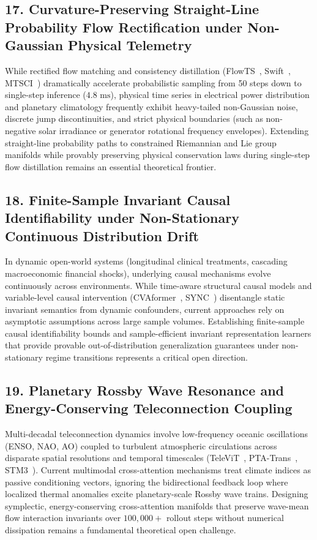 \subsection{17. Curvature-Preserving Straight-Line Probability Flow Rectification under Non-Gaussian Physical Telemetry}
While rectified flow matching and consistency distillation (FlowTS~\cite{Hu2024FlowTS}, Swift~\cite{Stock2025Swift}, MTSCI~\cite{Zhou2024MTSCI}) dramatically accelerate probabilistic sampling from 50 steps down to single-step inference ($4.8\text{ ms}$), physical time series in electrical power distribution and planetary climatology frequently exhibit heavy-tailed non-Gaussian noise, discrete jump discontinuities, and strict physical boundaries (such as non-negative solar irradiance or generator rotational frequency envelopes). Extending straight-line probability paths to constrained Riemannian and Lie group manifolds while provably preserving physical conservation laws during single-step flow distillation remains an essential theoretical frontier.

\subsection{18. Finite-Sample Invariant Causal Identifiability under Non-Stationary Continuous Distribution Drift}
In dynamic open-world systems (longitudinal clinical treatments, cascading macroeconomic financial shocks), underlying causal mechanisms evolve continuously across environments. While time-aware structural causal models and variable-level causal intervention (CVAformer~\cite{Zhang2026CVAformer}, SYNC~\cite{He2025SYNC}) disentangle static invariant semantics from dynamic confounders, current approaches rely on asymptotic assumptions across large sample volumes. Establishing finite-sample causal identifiability bounds and sample-efficient invariant representation learners that provide provable out-of-distribution generalization guarantees under non-stationary regime transitions represents a critical open direction.

\subsection{19. Planetary Rossby Wave Resonance and Energy-Conserving Teleconnection Coupling}
Multi-decadal teleconnection dynamics involve low-frequency oceanic oscillations (ENSO, NAO, AO) coupled to turbulent atmospheric circulations across disparate spatial resolutions and temporal timescales (TeleViT~\cite{Prapas2023TeleViT}, PTA-Trans~\cite{Lyu2025PTATrans}, STM3~\cite{Chen2025STM3}). Current multimodal cross-attention mechanisms treat climate indices as passive conditioning vectors, ignoring the bidirectional feedback loop where localized thermal anomalies excite planetary-scale Rossby wave trains. Designing symplectic, energy-conserving cross-attention manifolds that preserve wave-mean flow interaction invariants over $100{,}000+$ rollout steps without numerical dissipation remains a fundamental theoretical open challenge.

